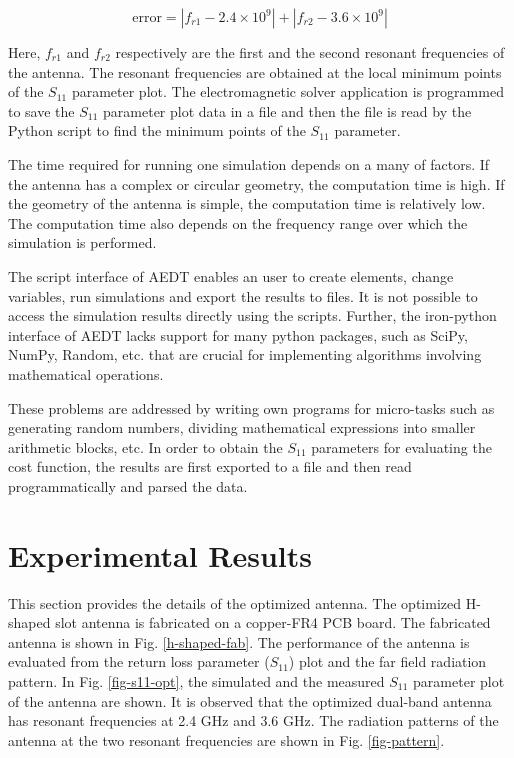 \begin{equation}\label{dual_cost}
\text{error}=\left|f_{r1}-2.4\times10^9\right|+\left|f_{r2}-3.6\times10^9\right|
\end{equation}

Here, $f_{r1}$ and $f_{r2}$ respectively are the first and the second resonant frequencies of the antenna. The resonant frequencies are obtained at the local minimum points of the $S_{11}$ parameter plot. The electromagnetic solver application is programmed to save the $S_{11}$ parameter plot data in a file and then the file is read by the Python script to find the minimum points of the $S_{11}$ parameter.

The time required for running one simulation depends on a many of factors. If the antenna has a complex or circular geometry, the computation time is high. If the geometry of the antenna is simple, the computation time is relatively low. The computation time also depends on the frequency range over which the simulation is performed.

The script interface of AEDT enables an user to create elements, change variables, run simulations and export the results to files. It is not possible to access the simulation results directly using the scripts. Further, the iron-python interface of AEDT lacks support for many python packages, such as SciPy, NumPy, Random, etc. that are crucial for implementing algorithms involving mathematical operations.

These problems are addressed by writing own programs for micro-tasks such as generating random numbers, dividing mathematical expressions into smaller arithmetic blocks, etc. In order to obtain the $S_{11}$ parameters for evaluating the cost function, the results are first exported to a file and then read programmatically and parsed the data.

\section{Experimental Results} \label{c3sec_expt-res}
This section provides the details of the optimized antenna. The optimized H-shaped slot antenna is fabricated on a copper-FR4 PCB board. The fabricated antenna is shown in Fig. \ref{h-shaped-fab}. The performance of the antenna is evaluated from the return loss parameter ($S_{11}$) plot and the far field radiation pattern. In Fig. \ref{fig-s11-opt}, the simulated and the measured $S_{11}$ parameter plot of the antenna are shown. It is observed that the optimized dual-band antenna has resonant frequencies at 2.4 GHz and 3.6 GHz. The radiation patterns of the antenna at the two resonant frequencies are shown in Fig. \ref{fig-pattern}.

